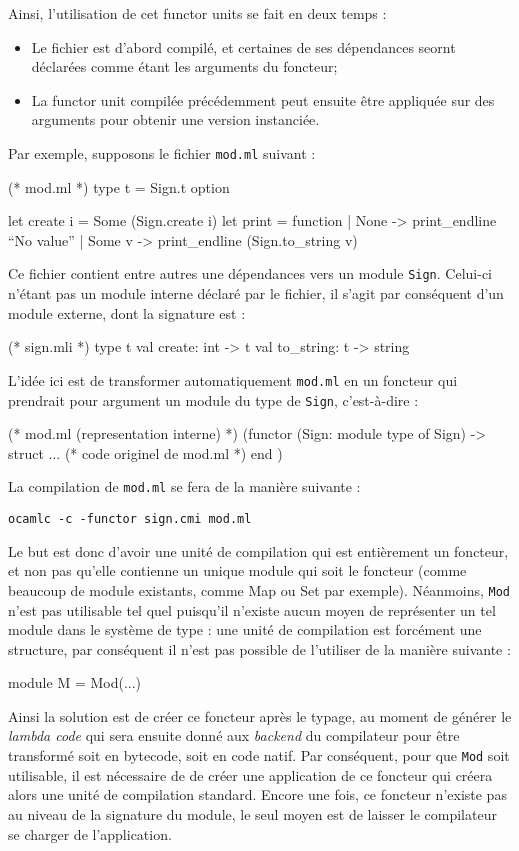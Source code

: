 \documentclass[11pt,a4paper]{report}
\begin{document}
Ainsi, l'utilisation de cet functor units se fait en deux temps :
\begin{itemize}
\item Le fichier est d'abord compilé, et certaines de ses dépendances seornt
  déclarées comme étant les arguments du foncteur;
\item La functor unit compilée précédemment peut ensuite être appliquée sur des
  arguments pour obtenir une version instanciée.
\end{itemize}

Par exemple, supposons le fichier \texttt{mod.ml} suivant :
\begin{OCaml}
(* mod.ml *)
type t = Sign.t option

let create i = Some (Sign.create i)
let print = function
  | None -> print_endline ``No value''
  | Some v -> print_endline (Sign.to_string v)
\end{OCaml}

Ce fichier contient entre autres une dépendances vers un module
\texttt{Sign}. Celui-ci n'étant pas un module interne déclaré par le fichier, il
s'agit par conséquent d'un module externe, dont la signature est :
\begin{OCaml}
(* sign.mli *)
type t
val create: int -> t
val to_string: t -> string
\end{OCaml}

L'idée ici est de transformer automatiquement \texttt{mod.ml} en un foncteur qui
prendrait pour argument un module du type de \texttt{Sign}, c'est-à-dire :
\begin{OCaml}
(* mod.ml (representation interne) *)
(functor (Sign: module type of Sign) ->
  struct 
   ... (* code originel de mod.ml *)
  end
) 
\end{OCaml}
La compilation de \texttt{mod.ml} se fera de la manière suivante :
\begin{verbatim}
ocamlc -c -functor sign.cmi mod.ml
\end{verbatim}

Le but est donc d'avoir une unité de compilation qui est entièrement un
foncteur, et non pas qu'elle contienne un unique module qui soit le foncteur
(comme beaucoup de module existants, comme Map ou Set par exemple). Néanmoins,
\texttt{Mod} n'est pas utilisable tel quel puisqu'il n'existe aucun moyen de
représenter un tel module dans le système de type : une unité de compilation est
forcément une structure, par conséquent il n'est pas possible de l'utiliser de
la manière suivante :
\begin{OCaml}
module M = Mod(...)
\end{OCaml}
Ainsi la solution est de créer ce foncteur après le typage, au moment de générer
le \emph{lambda code} qui sera ensuite donné aux \emph{backend} du compilateur
pour être transformé soit en bytecode, soit en code natif. Par conséquent, pour
que \texttt{Mod} soit utilisable, il est nécessaire de de créer une application
de ce foncteur qui créera alors une unité de compilation standard.  Encore une
fois, ce foncteur n'existe pas au niveau de la signature du module, le seul
moyen est de laisser le compilateur se charger de l'application.
\end{document}
